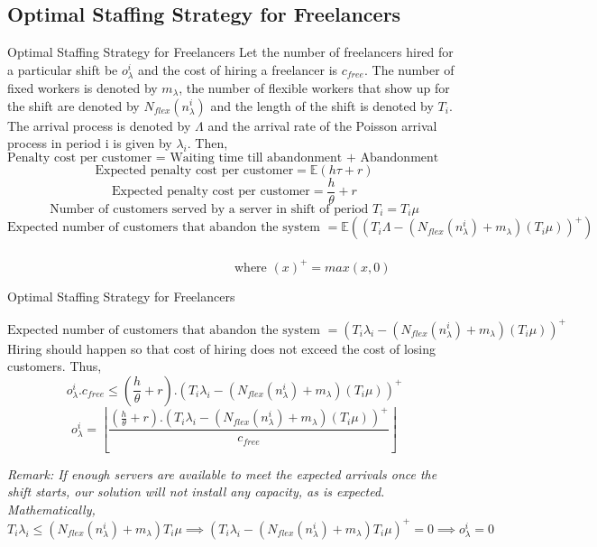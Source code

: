 \documentclass[8pt]{beamer}
\begin{document}
\subsection{Optimal Staffing Strategy for Freelancers} 
\begin{frame}{Optimal Staffing Strategy for Freelancers}
Let the number of freelancers hired for a particular shift be $o_{\lambda}^i$ and the cost of hiring a freelancer is $c_{free}$. The number of fixed workers is denoted by $m_{\lambda}$, the number of flexible workers that show up for the shift are denoted by $N_{flex}(n_{\lambda}^i)$ and the length of the shift is denoted by $T_i$. The arrival process is denoted by $\Lambda$ and the arrival rate of the Poisson arrival process in period i is given by $\lambda_i$.
Then, \\
\[\text{Penalty cost per customer = Waiting time till abandonment + Abandonment cost}\]
\[\text{Expected penalty cost per customer}=\mathbb{E}(h\tau+r)\]
\[\text{Expected penalty cost per customer} =\frac{h}{\theta} + r\]
\[\text{Number of customers served by a server in shift of period $T_i$} = T_i\mu\]
\[\text{Expected number of customers that abandon the system }=\mathbb{E}((T_i\Lambda - (N_{flex}(n_{\lambda}^i) + m_{\lambda})(T_i\mu))^+)\]  
\ \ \ \ \ \ \ \ \ \ \ \ \ \ \ \ \ \ \ \ \ \ \ \ \ \ \ \ \ \ \ \ \ \ \ \ \ \ \ \ \ \ \ \ \ \ \ \ \ \ \ \ \ \ \ \ \ \ \ \ \ \ \ \ \ \ \ \ \ \ \ \ \ \ \ \ \ \ \ \ \ \ \ \ \ \ \ \ \ \ \ \ \ \ \ \ \ \ \ \ \ \ \ \ \ \ \ \  where $(x)^+=max(x,0)$
\end{frame}
\begin{frame}{Optimal Staffing Strategy for Freelancers}

\[\text{Expected number of customers  that abandon the system }=(T_i\lambda_i - (N_{flex}(n_{\lambda}^i) + m_{\lambda})(T_i\mu))^+\]
Hiring should happen so that cost of hiring does not exceed the cost of losing customers. Thus, 
\[o_{\lambda}^i.c_{free}\leq (\frac{h}{\theta} + r).(T_i\lambda_i - (N_{flex}(n_{\lambda}^i) + m_{\lambda})(T_i\mu))^+\]
\[o_{\lambda}^i = \left \lfloor{\frac{(\frac{h}{\theta} + r).(T_i\lambda_i - (N_{flex}(n_{\lambda}^i) + m_{\lambda})(T_i\mu))^+}{c_{free}}}\right \rfloor \] 

\textit{Remark:
If enough servers are available to meet the expected arrivals once the shift starts, our solution will not install any capacity, as is expected. Mathematically, 
\[T_i\lambda_i \leq (N_{flex}(n_{\lambda}^i) + m_{\lambda})T_i\mu \implies (T_i\lambda_i - (N_{flex}(n_{\lambda}^i) + m_{\lambda})T_i\mu)^+=0 \implies o_{\lambda}^i=0\]
}
\end{frame}
\end{document}
